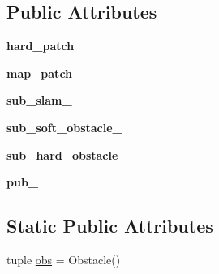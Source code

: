 \subsection*{\-Public \-Attributes}
\begin{DoxyCompactItemize}
\item 
\hypertarget{classpandora__costmap_1_1map__patch_1_1_mock_map_patcher_a7243aaaa810b48135cb60f21f0f5dae3}{{\bfseries hard\-\_\-patch}}\label{classpandora__costmap_1_1map__patch_1_1_mock_map_patcher_a7243aaaa810b48135cb60f21f0f5dae3}

\item 
\hypertarget{classpandora__costmap_1_1map__patch_1_1_mock_map_patcher_a44db4786c27c25949e6f7a733da4fe75}{{\bfseries map\-\_\-patch}}\label{classpandora__costmap_1_1map__patch_1_1_mock_map_patcher_a44db4786c27c25949e6f7a733da4fe75}

\item 
\hypertarget{classpandora__costmap_1_1map__patch_1_1_mock_map_patcher_a79769828ee26bb69a3952aa37d91029f}{{\bfseries sub\-\_\-slam\-\_\-}}\label{classpandora__costmap_1_1map__patch_1_1_mock_map_patcher_a79769828ee26bb69a3952aa37d91029f}

\item 
\hypertarget{classpandora__costmap_1_1map__patch_1_1_mock_map_patcher_a20c50d1ef400255f48fa0edf9e66cf25}{{\bfseries sub\-\_\-soft\-\_\-obstacle\-\_\-}}\label{classpandora__costmap_1_1map__patch_1_1_mock_map_patcher_a20c50d1ef400255f48fa0edf9e66cf25}

\item 
\hypertarget{classpandora__costmap_1_1map__patch_1_1_mock_map_patcher_a3eebbceff3c2564c2672c731129ac15b}{{\bfseries sub\-\_\-hard\-\_\-obstacle\-\_\-}}\label{classpandora__costmap_1_1map__patch_1_1_mock_map_patcher_a3eebbceff3c2564c2672c731129ac15b}

\item 
\hypertarget{classpandora__costmap_1_1map__patch_1_1_mock_map_patcher_ab9d5826a68aa39270d3c142772c5e907}{{\bfseries pub\-\_\-}}\label{classpandora__costmap_1_1map__patch_1_1_mock_map_patcher_ab9d5826a68aa39270d3c142772c5e907}

\end{DoxyCompactItemize}
\subsection*{\-Static \-Public \-Attributes}
\begin{DoxyCompactItemize}
\item 
tuple \hyperlink{classpandora__costmap_1_1map__patch_1_1_mock_map_patcher_a63d5887aca7a1dd30d9de2310edae78a}{obs} = \-Obstacle()
\end{DoxyCompactItemize}


